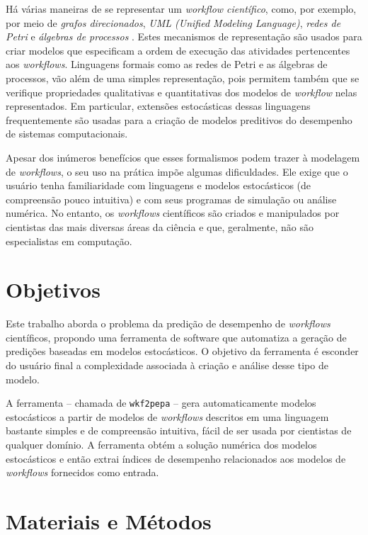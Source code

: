 \documentclass[a4paper,10pt]{article}
\begin{document}
        Há várias maneiras de se representar um \emph{workflow científico}, como, por exemplo, por meio de \emph{grafos direcionados}, \emph{UML \emph{(Unified Modeling Language)}}, \emph{redes de Petri} e \emph{álgebras de processos} \cite{phd:oga11}. Estes mecanismos de representação são usados para criar modelos que especificam a ordem de execução das atividades pertencentes aos \emph{workflows}. Linguagens formais como as redes de Petri e as álgebras de processos, vão além de uma simples representação, pois permitem também que se verifique propriedades qualitativas e quantitativas dos modelos de \emph{workflow} nelas representados. Em particular, extensões estocásticas dessas linguagens frequentemente são usadas para a criação de modelos preditivos do desempenho de sistemas computacionais.

        Apesar dos inúmeros benefícios que esses formalismos podem trazer à modelagem de \emph{workflows}, o seu uso na prática impõe algumas dificuldades.  Ele exige que o usuário tenha familiaridade com linguagens e modelos estocásticos (de compreensão pouco intuitiva) e com seus programas de simulação ou análise numérica. No entanto, os \emph{workflows} científicos são criados e manipulados por cientistas das mais diversas áreas da ciência e que, geralmente, não são especialistas em computação.

    \section*{Objetivos}

    Este trabalho aborda o problema da predição de desempenho de \emph{workflows} científicos, propondo uma ferramenta de software que automatiza a geração de predições baseadas em modelos estocásticos. O objetivo da ferramenta é esconder do usuário final a complexidade associada à criação e análise desse tipo de modelo.

     A ferramenta -- chamada de \texttt{wkf2pepa} -- gera automaticamente modelos estocásticos a partir de modelos de \emph{workflows} descritos em uma linguagem bastante simples e de compreensão intuitiva, fácil de ser usada por cientistas de qualquer domínio. A ferramenta obtém a solução numérica dos modelos estocásticos e então extrai índices de desempenho relacionados aos modelos de \emph{workflows} fornecidos como entrada.

    \section*{Materiais e Métodos}
\end{document}
